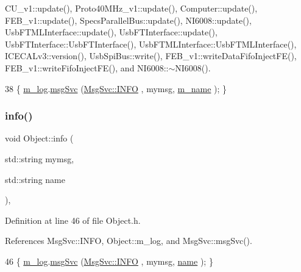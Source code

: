 C\+U\+\_\+v1\+::update(), Proto40\+M\+Hz\+\_\+v1\+::update(), Computer\+::update(), F\+E\+B\+\_\+v1\+::update(), Specs\+Parallel\+Bus\+::update(), N\+I6008\+::update(), Usb\+F\+T\+M\+L\+Interface\+::update(), Usb\+F\+T\+Interface\+::update(), Usb\+F\+T\+Interface\+::\+Usb\+F\+T\+Interface(), Usb\+F\+T\+M\+L\+Interface\+::\+Usb\+F\+T\+M\+L\+Interface(), I\+C\+E\+C\+A\+Lv3\+::version(), Usb\+Spi\+Bus\+::write(), F\+E\+B\+\_\+v1\+::write\+Data\+Fifo\+Inject\+F\+E(), F\+E\+B\+\_\+v1\+::write\+Fifo\+Inject\+F\+E(), and N\+I6008\+::$\sim$\+N\+I6008().


\begin{DoxyCode}
38 \{ \hyperlink{classObject_a0d269813dd7ac1f24bc143031e2963f2}{m\_log}.\hyperlink{classMsgSvc_ad25f18047920cc59a314e5098259711c}{msgSvc} (\hyperlink{classMsgSvc_ae671eb7301996cd049d2da8a65925926ad2fcf3f3e734fc41ee097cc23670ce51}{MsgSvc::INFO}    , mymsg, \hyperlink{classObject_a8b83c95c705d2c3ba0d081fe1710f48d}{m\_name} ); \}
\end{DoxyCode}
\mbox{\label{classObject_a1ca123253dfd30fc28b156f521dcbdae}} 
\subsubsection{\texorpdfstring{info()}{info()}\hspace{0.1cm}{\footnotesize\ttfamily [2/2]}}
{\footnotesize\ttfamily void Object\+::info (\begin{DoxyParamCaption}\item[{std\+::string}]{mymsg,  }\item[{std\+::string}]{name }\end{DoxyParamCaption})\hspace{0.3cm}{\ttfamily [inline]}, {\ttfamily [inherited]}}



Definition at line 46 of file Object.\+h.



References Msg\+Svc\+::\+I\+N\+FO, Object\+::m\+\_\+log, and Msg\+Svc\+::msg\+Svc().


\begin{DoxyCode}
46 \{ \hyperlink{classObject_a0d269813dd7ac1f24bc143031e2963f2}{m\_log}.\hyperlink{classMsgSvc_ad25f18047920cc59a314e5098259711c}{msgSvc} (\hyperlink{classMsgSvc_ae671eb7301996cd049d2da8a65925926ad2fcf3f3e734fc41ee097cc23670ce51}{MsgSvc::INFO}    , mymsg, \hyperlink{classObject_a300f4c05dd468c7bb8b3c968868443c1}{name} ); \}
\end{DoxyCode}
\mbox{\label{classLSDelayChipV1_af8bc9c84a1b65cbc2176fdbc349e829c}} 
